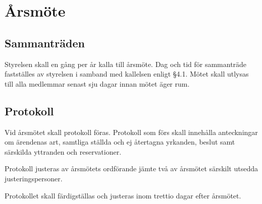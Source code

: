 \section{Årsmöte}
\subsection{Sammanträden} 
Styrelsen skall en gång per år kalla till årsmöte. Dag och tid för sammanträde fastställes av styrelsen i samband med kallelsen enligt §4.1. Mötet skall utlysas till alla medlemmar senast sju dagar innan mötet äger rum.
\subsection{Protokoll}

Vid årsmötet skall protokoll föras. Protokoll som förs skall innehålla anteckningar om ärendenas art, samtliga ställda och ej återtagna yrkanden, beslut samt särskilda yttranden och reservationer.

Protokoll justeras av årsmötets ordförande jämte två av årsmötet särskilt utsedda justeringspersoner.

Protokollet skall färdigställas och justeras inom trettio dagar efter årsmötet.

